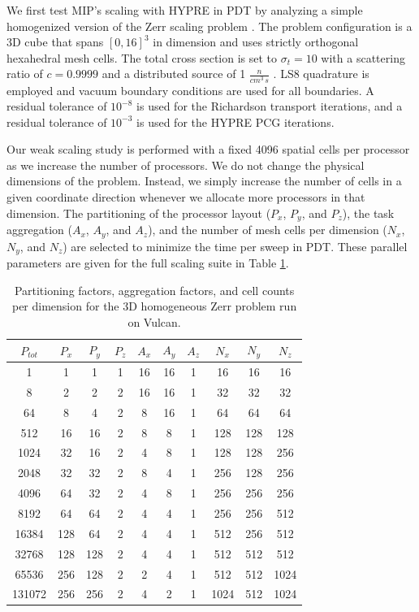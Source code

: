 We first test MIP's scaling with HYPRE in PDT by analyzing a simple homogenized version of the Zerr scaling problem \cite{zerr2011solution}. The problem configuration is a 3D cube that spans $[0,16]^3$ in dimension and uses strictly orthogonal hexahedral mesh cells. The total cross section is set to $\sigma_t=10$ with a scattering ratio of $c=0.9999$ and a distributed source of 1 $\frac{n}{cm^3 \, s}$ . LS8 quadrature is employed and vacuum boundary conditions are used for all boundaries. A residual tolerance of $10^{-8}$ is used for the Richardson transport iterations, and a residual tolerance of $10^{-3}$ is used for the HYPRE PCG iterations.

Our weak scaling study is performed with a fixed 4096 spatial cells per processor as we increase the number of processors. We do not change the physical dimensions of the problem. Instead, we simply increase the number of cells in a given coordinate direction whenever we allocate more processors in that dimension. The partitioning of the processor layout ($P_x$, $P_y$, and $P_z$), the task aggregation ($A_x$, $A_y$, and $A_z$), and the number of mesh cells per dimension ($N_x$, $N_y$, and $N_z$) are selected to minimize the time per sweep in PDT. These parallel parameters are given for the full scaling suite in Table \ref{tab::DSA_Vulcan_agg_part}.

\begin{table}[h]
\centering
\caption{Partitioning factors, aggregation factors, and cell counts per dimension for the 3D homogeneous Zerr problem run on Vulcan.}
\begin{tabular}{|c|c|c|c|c|c|c|c|c|c|}
\hline
$P_{tot}$&$P_{x}$&$P_{y}$&$P_{z}$&$A_{x}$&$A_{y}$&$A_{z}$ &$N_{x}$&$N_{y}$&$N_{z}$ \\
\hline \hline
1&1&1&1&16&16&1& 16&16&16 \\
8&2&2&2&16&16&1&32&32&32\\
64&8&4&2&8&16&1&64&64&64\\
512&16&16&	2&8&	8&1&128&128&128\\
1024&	32&16&2&4&8&1&128&128&256\\
2048&	32&32&2&8&4&1&256&128&256\\
4096&	64&32&2&4&8&1&256&256&256\\
8192&	64&64&2&4&4&1&256&256&512\\
16384&128&	64&2&4&4&1&512&256&	512\\
32768&128&	128&2&4&4&1&512&512&	512\\
65536&256&	128&2&2&4&1&512&512&	1024\\
131072&256&256&2&4&2&1&1024&512&1024\\
\hline
\end{tabular}
\label{tab::DSA_Vulcan_agg_part}
\end{table}

